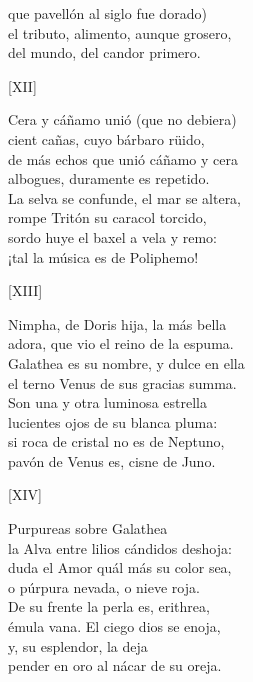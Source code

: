 \documentclass[11pt,a4paper,twoside]{article}
\begin{document}
que pavellón al siglo fue dorado)\\
el tributo, alimento, aunque grosero,\\
del  mundo, del candor primero.\par\pend
\relax
\vfill
\newpage
%
\begin{center}
	[XII]
\end{center}\pstart
Cera y cáñamo unió (que no debiera)\\
cient cañas, cuyo bárbaro rüido,\\
de más echos que unió cáñamo y cera\\
albogues, duramente es repetido.\\
La selva se confunde, el mar se altera,\\
rompe Tritón su caracol torcido,\\
sordo huye el baxel a vela y remo:\\
¡tal la música es de Poliphemo!\par\pend
%
\begin{center}
	[XIII]
\end{center}\pstart
Nimpha, de Doris hija, la más bella\\
adora, que vio el reino de la espuma.\\
Galathea es su nombre, y dulce en ella\\
el terno Venus de sus gracias summa.\\
Son una y otra luminosa estrella\\
lucientes ojos de su blanca pluma:\\
si roca de cristal no es de Neptuno,\\
pavón de Venus es, cisne de Juno.\par\pend 
%
\begin{center}
	[XIV]
\end{center}\pstart
Purpureas  sobre Galathea\\
la Alva entre lilios cándidos deshoja:\\
duda el Amor quál más su color sea,\\
o púrpura nevada, o nieve roja.\\
De su frente la perla es, erithrea,\\
émula vana. El ciego dios se enoja,\\
y,  su esplendor, la deja\\
pender en oro al nácar de su oreja.\par\pend
\end{document}
